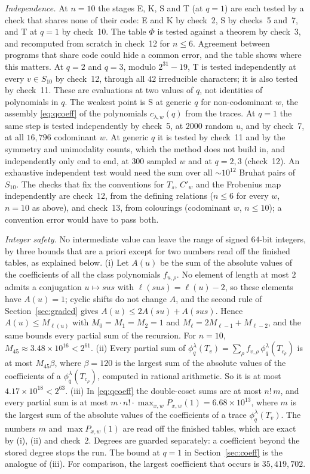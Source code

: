 \documentclass[11pt]{amsart}
\theoremstyle{definition}
\theoremstyle{remark}
\begin{document}
\emph{Independence.} At $n=10$ the stages E, K, S and T (at $q=1$) are each tested by a check that shares none of their code: E and K by check~2, S by checks~5 and~7, and T at $q=1$ by check~10. The table $\Phi$ is tested against a theorem by check~3, and recomputed from scratch in check~12 for $n\le6$. Agreement between programs that share code could hide a common error, and the table shows where this matters. At $q=2$ and $q=3$, modulo $2^{31}-19$, T is tested independently at every $v\in S_{10}$ by check~12, through all $42$ irreducible characters; it is also tested by check~11. These are evaluations at two values of $q$, not identities of polynomials in $q$. The weakest point is S at generic $q$ for non-codominant $w$, the assembly \eqref{eq:qcoeff} of the polynomials $c_{\lambda,w}(q)$ from the traces. At $q=1$ the same step is tested independently by check~5, at $2000$ random $u$, and by check~7, at all $16{,}796$ codominant $w$. At generic $q$ it is tested by check~11 and by the symmetry and unimodality counts, which the method does not build in, and independently only end to end, at $300$ sampled $w$ and at $q=2,3$ (check~12). An exhaustive independent test would need the sum over all $\sim10^{12}$ Bruhat pairs of $S_{10}$. The checks that fix the conventions for $T_s$, $C'_w$ and the Frobenius map independently are check~12, from the defining relations ($n\le6$ for every $w$, $n=10$ as above), and check~13, from colourings (codominant $w$, $n\le10$); a convention error would have to pass both.

\emph{Integer safety.} No intermediate value can leave the range of signed $64$-bit integers, by three bounds that are a priori except for two numbers read off the finished tables, as explained below. (i) Let $A(u)$ be the sum of the absolute values of the coefficients of all the class polynomials $f_{u,\rho}$. No element of length at most $2$ admits a conjugation $u\mapsto sus$ with $\ell(sus)=\ell(u)-2$, so these elements have $A(u)=1$; cyclic shifts do not change $A$, and the second rule of Section~\ref{sec:graded} gives $A(u)\le2A(su)+A(sus)$. Hence $A(u)\le M_{\ell(u)}$ with $M_0=M_1=M_2=1$ and $M_\ell=2M_{\ell-1}+M_{\ell-2}$, and the same bounds every partial sum of the recursion. For $n=10$, $M_{45}\approx3.48\times10^{16}<2^{61}$. (ii) Every partial sum of $\phi^\lambda_q(T_v)=\sum_\rho f_{v,\rho}\,\phi^\lambda_q(T_{c_\rho})$ is at most $M_{45}\beta$, where $\beta=120$ is the largest sum of the absolute values of the coefficients of a $\phi^\lambda_q(T_{c_\rho})$, computed in rational arithmetic. So it is at most $4.17\times10^{18}<2^{63}$. (iii) In \eqref{eq:qcoeff} the double-coset sums are at most $n!\,m$, and every partial sum is at most $m\cdot n!\cdot\max_{x,w}P_{x,w}(1)=6.68\times10^{13}$, where $m$ is the largest sum of the absolute values of the coefficients of a trace $\phi^\lambda_q(T_v)$. The numbers $m$ and $\max P_{x,w}(1)$ are read off the finished tables, which are exact by (i), (ii) and check~2. Degrees are guarded separately: a coefficient beyond the stored degree stops the run. The bound at $q=1$ in Section~\ref{sec:coeff} is the analogue of (iii). For comparison, the largest coefficient that occurs is $35{,}419{,}702$.
\end{document}
